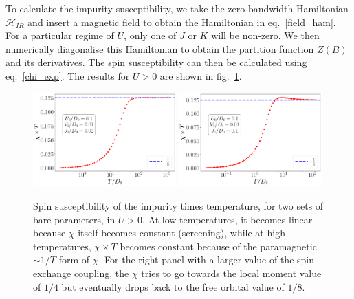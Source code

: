 \documentclass{report}
\numberwithin{equation}{section}
\begin{document}
To calculate the impurity susceptibility, we take the zero bandwidth Hamiltonian \(\mathcal{H}_{IR}\) and insert a magnetic field to obtain the Hamiltonian in eq.~\eqref{field_ham}. For a particular regime of \(U\), only one of \(J\) or \(K\) will be non-zero. We then numerically diagonalise this Hamiltonian to obtain the partition function \(Z(B)\) and its derivatives. The spin susceptibility can then be calculated using eq.~\eqref{chi_exp}. The results for \(U>0\) are shown in fig.~\ref{chi}.
\begin{figure}[htpb]
	\centering
	\includegraphics[width=0.49\textwidth]{../figures/chiT_J=0.020.pdf}
	\includegraphics[width=0.49\textwidth]{../figures/chiT_J=0.100.pdf}
	\caption{Spin susceptibility of the impurity times temperature, for two sets of bare parameters, in \(U>0\). At low temperatures, it becomes linear because \(\chi\) itself becomes constant (screening), while at high temperatures, \(\chi\times T\) becomes constant because of the paramagnetic \(\sim 1/T\) form of \(\chi\). For the right panel with a larger value of the spin-exchange coupling, the \(\chi\) tries to go towards the local moment value of \(1/4\) but eventually drops back to the free orbital value of \(1/8\).}
	\label{chi}
\end{figure}
\end{document}
